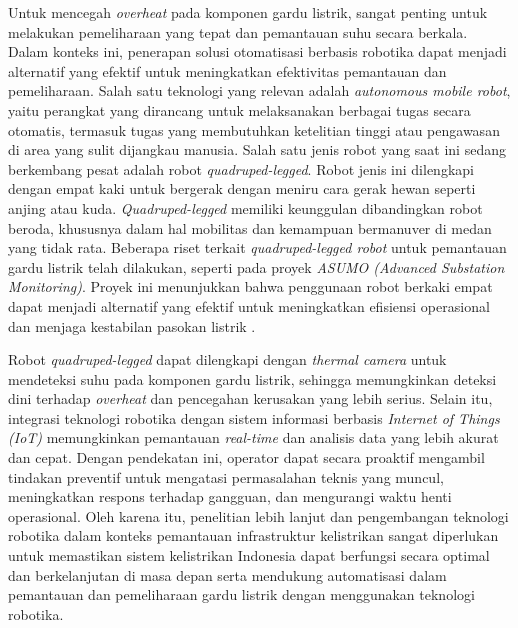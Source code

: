 Untuk mencegah \emph{overheat} pada komponen gardu listrik, sangat penting untuk melakukan pemeliharaan yang tepat dan pemantauan suhu secara berkala. Dalam konteks ini, penerapan solusi otomatisasi berbasis robotika dapat menjadi alternatif yang efektif untuk meningkatkan efektivitas pemantauan dan pemeliharaan. Salah satu teknologi yang relevan adalah \emph{autonomous mobile robot}, yaitu perangkat yang dirancang untuk melaksanakan berbagai tugas secara otomatis, termasuk tugas yang membutuhkan ketelitian tinggi atau pengawasan di area yang sulit dijangkau manusia. Salah satu jenis robot yang saat ini sedang berkembang pesat adalah robot \emph{quadruped-legged}. Robot jenis ini dilengkapi dengan empat kaki untuk bergerak dengan meniru cara gerak hewan seperti anjing atau kuda. \emph{Quadruped-legged} memiliki keunggulan dibandingkan robot beroda, khususnya dalam hal mobilitas dan kemampuan bermanuver di medan yang tidak rata. Beberapa riset terkait \emph{quadruped-legged robot} untuk pemantauan gardu listrik telah dilakukan, seperti pada proyek \emph{ASUMO (Advanced Substation Monitoring)}. Proyek ini menunjukkan bahwa penggunaan robot berkaki empat dapat menjadi alternatif yang efektif untuk meningkatkan efisiensi operasional dan menjaga kestabilan pasokan listrik \cite{ASUMO2023}.  

Robot \emph{quadruped-legged}  dapat dilengkapi dengan \emph{thermal camera} untuk mendeteksi suhu pada komponen gardu listrik, sehingga memungkinkan deteksi dini terhadap \emph{overheat} dan pencegahan kerusakan yang lebih serius. Selain itu, integrasi teknologi robotika dengan sistem informasi berbasis \emph{Internet of Things (IoT)} memungkinkan pemantauan \emph{real-time} dan analisis data yang lebih akurat dan cepat. Dengan pendekatan ini, operator dapat secara proaktif mengambil tindakan preventif untuk mengatasi permasalahan teknis yang muncul, meningkatkan respons terhadap gangguan, dan mengurangi waktu henti operasional. Oleh karena itu, penelitian lebih lanjut dan pengembangan teknologi robotika dalam konteks pemantauan infrastruktur kelistrikan sangat diperlukan untuk memastikan sistem kelistrikan Indonesia dapat berfungsi secara optimal dan berkelanjutan di masa depan serta mendukung automatisasi dalam pemantauan dan pemeliharaan gardu listrik dengan menggunakan teknologi robotika.

